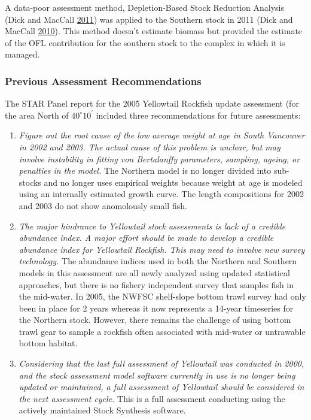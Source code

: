 \documentclass[12pt,]{article}
\begin{document}
A data-poor assessment method, Depletion-Based Stock Reduction Analysis
(Dick and MacCall \protect\hyperlink{ref-Dick2011}{2011}) was applied to
the Southern stock in 2011 (Dick and MacCall
\protect\hyperlink{ref-Dick2010}{2010}). This method doesn't estimate
biomass but provided the estimate of the OFL contribution for the
southern stock to the complex in which it is managed.

\subsubsection{Previous Assessment
Recommendations}\label{previous-assessment-recommendations}

The STAR Panel report for the 2005 Yellowtail Rockfish update assessment
(for the area North of \(40^\circ 10^\prime\) included three
recommendations for future assessments:

\begin{enumerate}
\def\labelenumi{\arabic{enumi}.}
\item
  \emph{Figure out the root cause of the low average weight at age in South Vancouver in 2002 and 2003. The actual cause of this problem is unclear, but may involve instability in fitting von Bertalanffy parameters, sampling, ageing, or penalties in the model.}
  The Northern model is no longer divided into sub-stocks and no longer
  uses empirical weights because weight at age is modeled using an
  internally estimated growth curve. The length compositions for 2002
  and 2003 do not show anomolously small fish.
\item
  \emph{The major hindrance to Yellowtail stock assessments is lack of a credible abundance index. A major effort should be made to develop a credible abundance index for Yellowtail Rockfish. This may need to involve new survey technology.}
  The abundance indices used in both the Northern and Southern models in
  this assessment are all newly analyzed using updated statistical
  approaches, but there is no fishery independent survey that samples
  fish in the mid-water. In 2005, the NWFSC shelf-slope bottom trawl
  survey had only been in place for 2 years whereas it now represents a
  14-year timeseries for the Northern stock. However, there remains the
  challenge of using bottom trawl gear to sample a rockfish often
  associated with mid-water or untrawable bottom habitat.
\item
  \emph{Considering that the last full assessment of Yellowtail was conducted in 2000, and the stock assessment model software currently in use is no longer being updated or maintained, a full assessment of Yellowtail should be considered in the next assessment cycle.}
  This is a full assessment conducting using the actively maintained
  Stock Synthesis software.
\end{enumerate}
\end{document}
